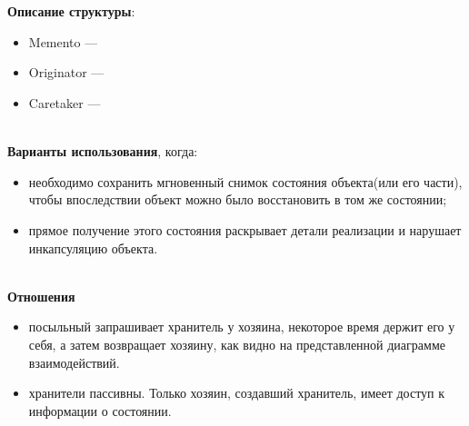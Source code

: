 \documentclass[a3paper,11pt]{report}
\def \boxSize {7cm}
\def \sboxSize {5cm}
\newcommand{\umlnoteND}[6]{
	\node[umlcd style, anchor=north, draw, shape=umlcdnote, text width=#2] at (#1) (note) {#3};
	\draw [umlcd style dashed line , ] (note.#4) ++(#5) --++(#6) coordinate(tmp) node[circle,inner sep=0pt,draw, fill=black!1, minimum size=5pt] (NoD) { };
}
\begin{document}
\\\\
\textbf{Описание структуры}:
\begin{itemize}
\item Memento ---
\item Originator ---
\item Caretaker ---
\end{itemize}

\large\textbf{\\Варианты использования}, когда:
\begin{itemize}
\item необходимо сохранить мгновенный снимок состояния объекта(или его части), чтобы впоследствии объект можно было восстановить в том же состоянии;
\item прямое получение этого состояния раскрывает детали реализации и нарушает инкапсуляцию объекта.
\end{itemize}

\textbf{\\Отношения}
\begin{itemize}
\item посыльный запрашивает хранитель у хозяина, некоторое время держит его у себя, а затем возвращает хозяину, как видно на представленной диаграмме взаимодействий.
\item хранители пассивны. Только хозяин, создавший хранитель, имеет доступ к информации о состоянии.
\end{itemize}
\end{document}
